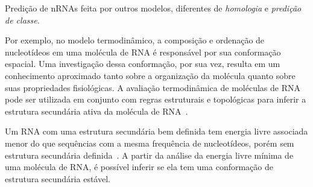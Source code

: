 Predição de nRNAs feita por outros modelos, diferentes de {\it homologia} e {\it predição de classe}.

Por exemplo, no modelo termodinâmico, a composição e ordenação de nucleotídeos em uma molécula de RNA é responsável por sua conformação espacial. Uma investigação dessa conformação, por sua vez, resulta em um conhecimento aproximado tanto sobre a organização da molécula quanto sobre suas propriedades fisiológicas. A avaliação termodinâmica de moléculas de RNA pode ser utilizada em conjunto com regras estruturais e topológicas para inferir a estrutura secundária ativa da molécula de RNA~\citep{zuker1981optimal:1981}. 


Um RNA com uma estrutura secundária bem definida tem energia livre associada menor do que sequências com a mesma frequência de nucleotídeos, porém sem estrutura secundária definida~\citep{machado2008computational:2008}. A partir da análise da energia livre mínima de uma molécula de RNA, é possível inferir se ela tem uma conformação de estrutura secundária estável.



